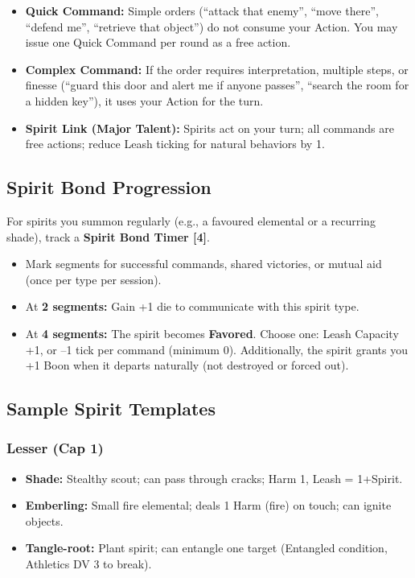 \begin{itemize}
  \item \textbf{Quick Command:} Simple orders (``attack that enemy'', ``move there'', ``defend me'', ``retrieve that object'') do not consume your Action. You may issue one Quick Command per round as a free action.
  \item \textbf{Complex Command:} If the order requires interpretation, multiple steps, or finesse (``guard this door and alert me if anyone passes'', ``search the room for a hidden key''), it uses your Action for the turn.
  \item \textbf{Spirit Link (Major Talent):} Spirits act on your turn; all commands are free actions; reduce Leash ticking for natural behaviors by 1.
\end{itemize}

\subsection{Spirit Bond Progression}

For spirits you summon regularly (e.g., a favoured elemental or a recurring shade), track a \textbf{Spirit Bond Timer [4]}.

\begin{itemize}
  \item Mark segments for successful commands, shared victories, or mutual aid (once per type per session).
  \item At \textbf{2 segments:} Gain +1 die to communicate with this spirit type.
  \item At \textbf{4 segments:} The spirit becomes \textbf{Favored}. Choose one: Leash Capacity +1, or --1 tick per command (minimum 0). Additionally, the spirit grants you +1 Boon when it departs naturally (not destroyed or forced out).
\end{itemize}

\subsection{Sample Spirit Templates}

\subsubsection{Lesser (Cap 1)}

\begin{itemize}
  \item \textbf{Shade:} Stealthy scout; can pass through cracks; Harm 1, Leash = 1+Spirit.
  \item \textbf{Emberling:} Small fire elemental; deals 1 Harm (fire) on touch; can ignite objects.
  \item \textbf{Tangle-root:} Plant spirit; can entangle one target (Entangled condition, Athletics DV 3 to break).
\end{itemize}

